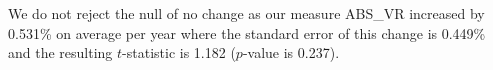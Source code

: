 We do not reject the null of no change as our measure ABS\_VR increased by 0.531\% on average per year where the standard error of this change is 0.449\% and the resulting $t$-statistic is 1.182 ($p$-value is 0.237).